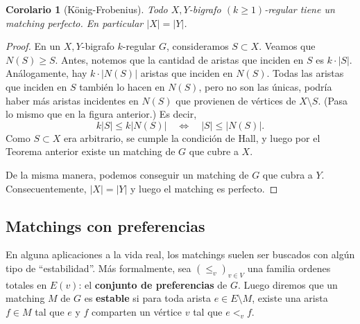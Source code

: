 \documentclass[12pt]{report}
\theoremstyle{plain}
\newtheorem{corollary}[theorem]{Corolario}
\theoremstyle{definition}
\newcommand{\abs}[1]{\left \vert #1 \right \vert}
\begin{document}
\begin{corollary}[König-Frobenius]\label{corollary:König-Frobenius - todo bigrafo regular no trivial tiene un matching perfecto}
Todo $X,Y$-bigrafo $(k \geq 1)$-regular tiene un matching perfecto. En particular $\abs X = \abs Y$.
\end{corollary}
\begin{proof}
En un $X,Y$-bigrafo $k$-regular $G$, consideramos $S \subset X$. Veamos que $N(S) \geq S$. Antes, notemos que
la cantidad de aristas que inciden en $S$ es $k \cdot \abs S$. Análogamente, hay $k \cdot \abs{N(S)}$
aristas que inciden en $N(S)$. Todas las aristas que inciden en $S$ también lo hacen en $N(S)$, pero no son
las únicas, podría haber más aristas incidentes en $N(S)$ que provienen de vértices de $X \setminus S$. (Pasa lo
mismo que en la figura anterior.) Es
decir,
 \[
     k \abs S \leq k \abs{N(S)} \quad \Leftrightarrow \quad \abs S \leq \abs{N(S)}.
 \]
Como $S\subset X$ era arbitrario, se cumple la condición de Hall, y luego por el Teorema anterior existe un
matching de $G$ que cubre a $X$.

De la misma manera, podemos conseguir un matching de $G$ que cubra a $Y$. Consecuentemente, $\abs X = \abs Y$
y luego el matching es perfecto.
\end{proof}


\subsection{Matchings con preferencias}

En alguna aplicaciones a la vida real, los matchings suelen ser buscados con algún tipo de ``estabilidad''. Más formalmente, sea $(\leq_v)_{v \in V}$ una familia ordenes totales en $E(v)$: el \textbf{conjunto de preferencias} de $G$. Luego diremos que un matching $M$ de $G$ es \textbf{estable} si para toda arista $e \in E \setminus M$, existe una arista $f \in M$ tal que $e$ y $f$ comparten un vértice $v$ tal que $e <_v f$.
\end{document}
